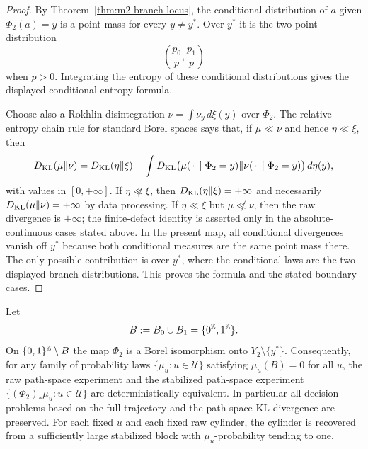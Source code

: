 \begin{proof}
By Theorem~\ref{thm:m2-branch-locus}, the conditional distribution of $a$
given $\Phi_2(a)=y$ is a point mass for every $y\ne y^\ast$.  Over
$y^\ast$ it is the two-point distribution
\[
\left(\frac{p_0}{p},\frac{p_1}{p}\right)
\]
when $p>0$.  Integrating the entropy of these conditional distributions gives
the displayed conditional-entropy formula.

Choose also a Rokhlin disintegration
$\nu=\int\nu_y\,d\xi(y)$ over $\Phi_2$.  The relative-entropy chain rule for
standard Borel spaces says that, if $\mu\ll\nu$ and hence $\eta\ll\xi$, then
\[
D_{\mathrm{KL}}(\mu\|\nu)
=D_{\mathrm{KL}}(\eta\|\xi)
+\int D_{\mathrm{KL}}\bigl(\mu(\,\cdot\,\mid \Phi_2=y)\|
\nu(\,\cdot\,\mid \Phi_2=y)\bigr)\,d\eta(y),
\]
with values in $[0,+\infty]$.  If $\eta\not\ll\xi$, then
$D_{\mathrm{KL}}(\eta\|\xi)=+\infty$ and necessarily $D_{\mathrm{KL}}(\mu\|\nu)=+\infty$ by
data processing.  If $\eta\ll\xi$ but $\mu\not\ll\nu$, then the raw divergence
is $+\infty$; the finite-defect identity is asserted only in the
absolute-continuous cases stated above.  In the present map, all conditional
divergences vanish off $y^\ast$ because both conditional measures are the same
point mass there.  The only possible contribution is over $y^\ast$, where the
conditional laws are the two displayed branch distributions.  This proves the
formula and the stated boundary cases.
\end{proof}

\begin{corollary}\label{cor:m2-asymptotic-sufficiency}
Let
\[
B:=B_0\cup B_1=\{0^{\mathbb{Z}},1^{\mathbb{Z}}\}.
\]
On $\{0,1\}^{\mathbb{Z}}\setminus B$ the map $\Phi_2$ is a Borel isomorphism onto
$Y_2\setminus\{y^\ast\}$.  Consequently, for any family of probability laws
$\{\mu_u:u\in\mathcal U\}$ satisfying $\mu_u(B)=0$ for all $u$, the raw
path-space experiment and the stabilized path-space experiment
$\{(\Phi_2)_*\mu_u:u\in\mathcal U\}$ are deterministically equivalent.  In
particular all decision problems based on the full trajectory and the
path-space KL divergence are preserved.  For each fixed $u$ and each fixed
raw cylinder, the cylinder is recovered from a sufficiently large stabilized
block with $\mu_u$-probability tending to one.
\end{corollary}

